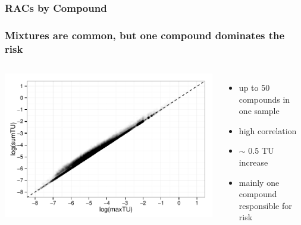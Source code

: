 \documentclass[10pt
	]{beamer}
\begin{document}
\begin{frame}
\frametitle{RACs by Compound}
	\begin{adjustbox}{max totalsize={\textwidth}{0.95\textheight}}
				
	\end{adjustbox}
\end{frame}



\begin{frame}
\frametitle{Mixtures are common, but one compound dominates the risk}
	\begin{columns}
	    	\vspace{0.5cm}
	    	\includegraphics[width=\textwidth, keepaspectratio]{figs/tusum_tumax.pdf}
	        \begin{itemize}
	        	\item up to 50 compounds in one sample
	        	\item high correlation
	        	\item $\sim$ 0.5 TU increase 
	        	\item mainly one compound responsible for risk
	        \end{itemize}
	\end{columns}
\end{frame}
\end{document}
